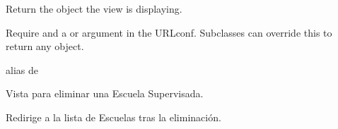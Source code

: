 \documentclass[letterpaper,10pt,spanish]{sphinxmanual}
\begin{document}
\begin{fulllineitems}
\begin{fulllineitems}
\pysigstartsignatures
{}
\pysigstopsignatures
\sphinxAtStartPar
Return the object the view is displaying.

\sphinxAtStartPar
Require  and a  or  argument in the URLconf.
Subclasses can override this to return any object.

\end{fulllineitems}



\begin{fulllineitems}

\pysigstartsignatures
{}
\pysigstopsignatures
\sphinxAtStartPar
alias de 

\end{fulllineitems}



\begin{fulllineitems}

\pysigstartsignatures
{}
\pysigstopsignatures
\end{fulllineitems}



\begin{fulllineitems}

\pysigstartsignatures
{}
\pysigstopsignatures
\end{fulllineitems}


\end{fulllineitems}



\begin{fulllineitems}

\pysigstartsignatures
{}
\pysigstopsignatures
\sphinxAtStartPar
Vista para eliminar una Escuela Supervisada.

\sphinxAtStartPar
Redirige a la lista de Escuelas tras la eliminación.


\begin{fulllineitems}

\pysigstartsignatures
{}
\pysigstopsignatures
\end{fulllineitems}


\end{fulllineitems}
\end{document}
